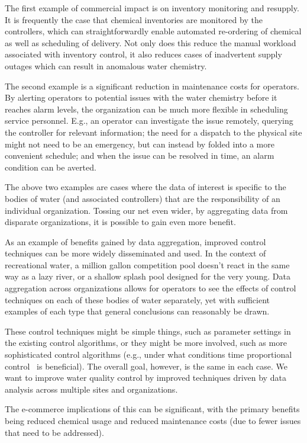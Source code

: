The first example of commercial impact is on inventory monitoring
and resupply. It is frequently the case that chemical inventories
are monitored by the controllers, which can straightforwardly enable
automated re-ordering of chemical as well as scheduling of delivery.
Not only does this reduce the manual workload associated with
inventory control, it also reduces cases of inadvertent supply outages
which can result in anomalous water chemistry.

The second example is a significant reduction in maintenance costs
for operators.  By alerting operators to potential
issues with the water chemistry before it reaches alarm levels, 
the organization can be much more flexible in scheduling service
personnel. E.g., an operator can investigate the issue remotely,
querying the controller for relevant information; the need for
a dispatch to the physical site might not need to be an emergency, but can
instead by folded into a more convenient schedule; and when the
issue can be resolved in time, an alarm condition can be averted.

The above two examples are cases where the data of interest is specific
to the bodies of water (and associated controllers) that are the
responsibility of an individual organization.  Tossing our net
even wider, by aggregating data from disparate organizations, it
is possible to gain even more benefit.

As an example of benefits gained by data aggregation, improved
control techniques can be more widely disseminated and used.
In the context of recreational water, a million gallon competition
pool doesn't react in the same way as a lazy river, or a shallow
splash pool designed for the very young. Data aggregation across
organizations allows for operators to see the effects of control
techniques on each of these bodies of water separately, yet with
sufficient examples of each type that general conclusions can
reasonably be drawn.

These control techniques might be simple things, such as parameter
settings in the existing control algorithms, or they might be
more involved, such as more sophisticated control algorithms
(e.g., under what conditions time proportional control~\cite{McP13}
is beneficial). The overall goal, however, is the same in each
case. We want to improve water quality control by improved techniques
driven by data analysis across multiple sites and organizations.

The e-commerce implications of this can be significant, with the
primary benefits being reduced chemical usage and reduced maintenance
costs (due to fewer issues that need to be addressed).

